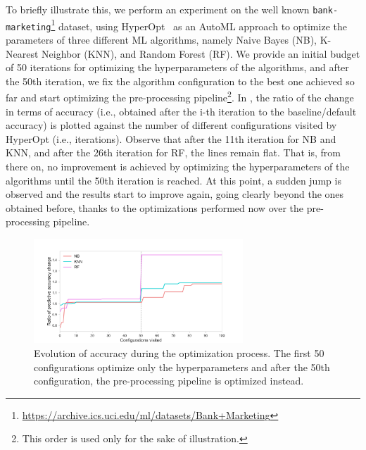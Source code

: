 To briefly illustrate this, we perform an experiment on the well known \texttt{bank-marketing}\footnote{\url{https://archive.ics.uci.edu/ml/datasets/Bank+Marketing}} dataset, using HyperOpt~\cite{HyperOptICML13} as an AutoML approach to optimize the parameters of three different ML algorithms, namely Naive Bayes (NB), K-Nearest Neighbor (KNN), and Random Forest (RF).
We provide an initial budget of 50 iterations for optimizing the hyperparameters of the algorithms, and after the 50th iteration, we fix the algorithm configuration to the best one achieved so far and start optimizing the pre-processing pipeline\footnote{This order is used only for the sake of illustration.}.
In , the ratio of the change in terms of accuracy (i.e., obtained after the i-th iteration to the baseline/default accuracy) is plotted against the number of different configurations visited by HyperOpt (i.e., iterations).
Observe that after the 11th iteration for NB and KNN, and after the 26th iteration for RF, the lines remain flat.
That is, from there on, no improvement is achieved by optimizing the hyperparameters of the algorithms until the 50th iteration is reached. At this point, a sudden jump is observed and the results start to improve again, going clearly beyond the ones obtained before, thanks to the optimizations performed now over the pre-processing pipeline.

\begin{figure}[t]
    \centering
    \includegraphics[width=0.7\textwidth]{chapters/data-centric/supervised/img/pre-processing-impact.pdf}
    \caption{Evolution of accuracy during the optimization process. The first 50 configurations optimize only the hyperparameters and after the 50th configuration, the pre-processing pipeline is optimized instead.}
    \label{effective-fig:pre-processing-impact}
\end{figure}

